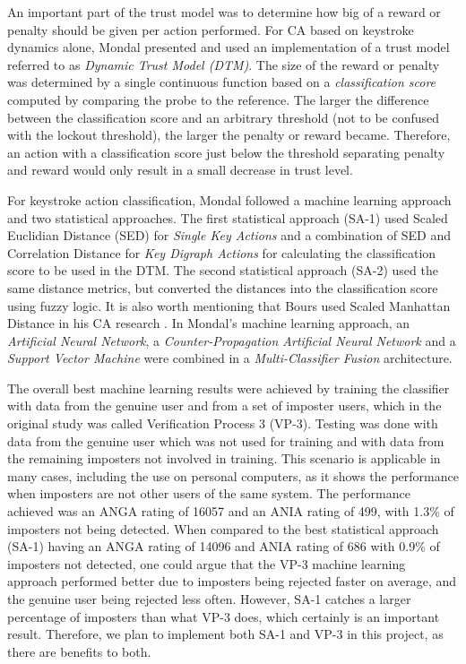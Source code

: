 \documentclass[informationsecurity]{gucmasterproject}
\begin{document}
An important part of the trust model was to determine how big of a reward or penalty should be given per action performed.
For CA based on keystroke dynamics alone, Mondal \cite{mondal} presented and used an implementation of a trust model referred to as \textit{Dynamic Trust Model (DTM)}.
The size of the reward or penalty was determined by a single continuous function based on a \textit{classification score} computed by comparing the probe to the reference.
The larger the difference between the classification score and an arbitrary threshold (not to be confused with the lockout threshold), the larger the penalty or reward became.
Therefore, an action with a classification score just below the threshold separating penalty and reward would only result in a small decrease in trust level.

For keystroke action classification, Mondal followed a machine learning approach and two statistical approaches.
The first statistical approach (SA-1) used Scaled Euclidian Distance (SED) for \textit{Single Key Actions} and a combination of SED and Correlation Distance for \textit{Key Digraph Actions} for calculating the classification score to be used in the DTM. 
The second statistical approach (SA-2) used the same distance metrics, but converted the distances into the classification score using fuzzy logic.
It is also worth mentioning that Bours used Scaled Manhattan Distance in his CA research \cite{BOURS201236}.
In Mondal's \cite{mondal} machine learning approach, an \textit{Artificial Neural Network}, a \textit{Counter-Propagation Artificial Neural Network} and a \textit{Support Vector Machine} were combined in a \textit{Multi-Classifier Fusion} architecture. 

The overall best machine learning results were achieved by training the classifier with data from the genuine user and from a set of imposter users, which in the original study \cite{mondal} was called Verification Process 3 (VP-3).
Testing was done with data from the genuine user which was not used for training and with data from the remaining imposters not involved in training.
This scenario is applicable in many cases, including the use on personal computers, as it shows the performance when imposters are not other users of the same system.
The performance achieved was an ANGA rating of 16057 and an ANIA rating of 499, with 1.3\% of imposters not being detected.
When compared to the best statistical approach (SA-1) having an ANGA rating of 14096 and ANIA rating of 686 with 0.9\% of imposters not detected, one could argue that the VP-3 machine learning approach performed better due to imposters being rejected faster on average, and the genuine user being rejected less often.
However, SA-1 catches a larger percentage of imposters than what VP-3 does, which certainly is an important result.
Therefore, we plan to implement both SA-1 and VP-3 in this project, as there are benefits to both.
\end{document}
